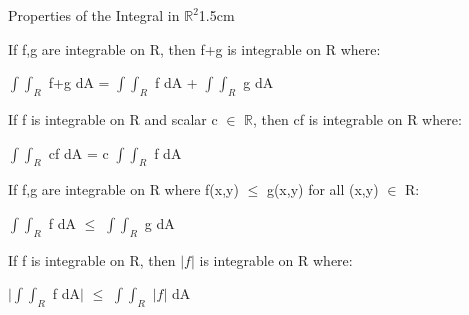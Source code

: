     \begin{ltheorem}{Properties of the Integral in $\mathbb{R}^2$}{1.5cm}
        \item If f,g are integrable on R, then f+g is integrable on R where:
        
            \hspace{0.5cm}
            $\int \int_R$ f+g dA
            = $\int \int_R$ f dA + $\int \int_R$ g dA

        \item If f is integrable on R and scalar c $\in$ $\mathbb{R}$,
            then cf is integrable on R where:
        
            \hspace{0.5cm}
            $\int \int_R$ cf dA
            = c $\int \int_R$ f dA

        \item If f,g are integrable on R where f(x,y) $\leq$ g(x,y) for all
            (x,y) $\in$ R:
        
            \hspace{0.5cm}
            $\int \int_R$ f dA
            $\leq$ $\int \int_R$ g dA

        \item If f is integrable on R, then $|f|$ is integrable on R where:
        
            \hspace{0.5cm}
            $|$$\int \int_R$ f dA$|$
            $\leq$ $\int \int_R$ $|f|$ dA
    \end{ltheorem}

    \newpage




